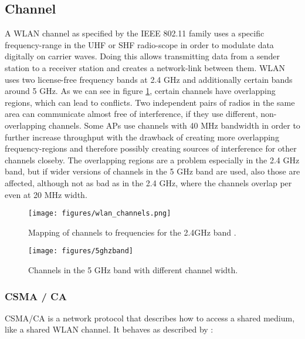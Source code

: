   \subsection{Channel}
    A \ac{WLAN} channel as specified by the IEEE 802.11 family uses a specific frequency-range in the \ac{UHF} or \ac{SHF} radio-scope in order 
    to modulate data digitally on carrier waves.
    Doing this allows transmitting data from a sender station to a receiver station and creates a network-link between them.
    \ac{WLAN} uses two license-free frequency bands at 2.4 GHz and additionally certain bands around 5 GHz.
    As we can see in figure \ref{fig:wlan_channels}, certain channels have overlapping regions, which can lead to conflicts.
    Two independent pairs of radios in the same area can communicate almost free of interference, if they use different, non-overlapping channels.
    Some APs use channels with 40 MHz bandwidth in order to further increase throughput with the drawback of creating more overlapping frequency-regions
    and therefore possibly creating sources of interference for other channels closeby.
    The overlapping regions are a problem especially in the 2.4 GHz band, but if wider versions of channels in the 5 GHz band are used, also those are affected,
    although not as bad as in the 2.4 GHz, where the channels overlap per even at 20 MHz width.
    
    \begin{figure}[bh!]
      \centering
      \texttt{[image: figures/wlan\_channels.png]}
      \caption{Mapping of channels to frequencies for the 2.4GHz band \cite{wlan_channels}.}
      \label{fig:wlan_channels}
    \end{figure}
    
    \begin{figure}[bh!]
      \centering
      \texttt{[image: figures/5ghzband]}
      \caption{Channels in the 5 GHz band with different channel width.}
      \label{fig:5ghzband}
    \end{figure}
    
      \subsubsection{CSMA / CA}
	\ac{CSMA/CA} is a network protocol that describes how to access a shared medium, like a shared \ac{WLAN} channel.
	It behaves as described by \cite{csma_techo}:
	
